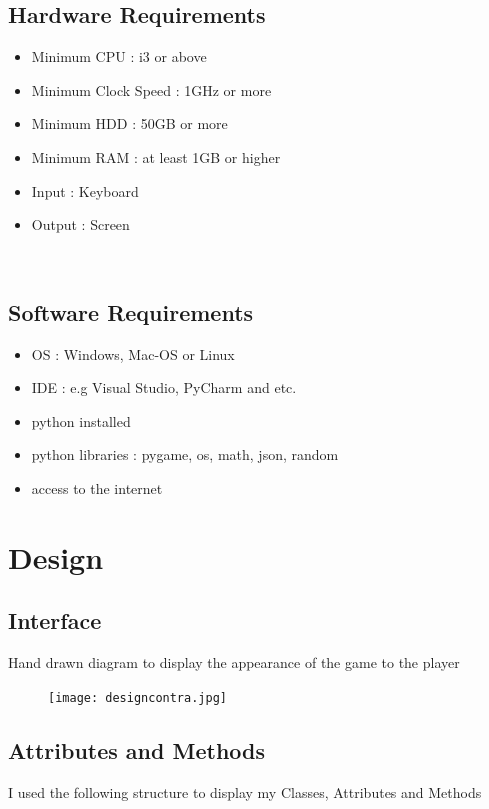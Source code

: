 \documentclass[12pt]{article}
\begin{document}
\subsection{Hardware Requirements}
\begin{itemize}
    \item Minimum CPU : i3 or above 
    \item Minimum Clock Speed : 1GHz or more
    \item Minimum HDD : 50GB or more
    \item Minimum RAM : at least 1GB or higher
    \item Input : Keyboard 
    \item Output : Screen 
\end{itemize}
\\

\subsection{Software Requirements}
\begin{itemize}
    \item OS : Windows, Mac-OS or Linux
    \item IDE : e.g Visual Studio, PyCharm and etc.
    \item python installed
    \item python libraries : pygame, os, math, json, random
    \item access to the internet
\end{itemize}

\newpage
\section{Design}
\subsection{Interface}
Hand drawn diagram to display the appearance of the game to the player
\begin{figure}[H]
    \texttt{[image: designcontra.jpg]}
    \centering
\end{figure}
\FloatBarrier


\newpage
\subsection{Attributes and Methods}
I used the following structure to display my Classes, Attributes and Methods
\begin{table}[H]
    \centering
\end{table}
\end{document}
